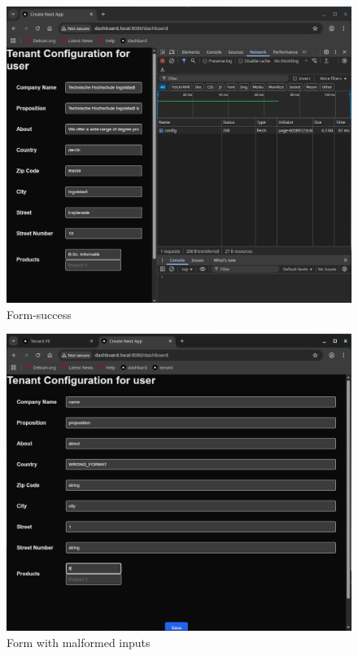 \documentclass[11pt, a4paper, oneside, listof=totoc]{scrartcl}
\begin{document}
                \begin{figure}[h!]
                    \centering
                    \includegraphics[width=\textwidth]{screenshots/eval/dashboardfe/dashboardfe-form-200.png}
                    \caption{Form-success}\label{fig:dashboardfe-form-200}
                \end{figure}

                \begin{figure}[h!]
                    \centering
                    \includegraphics[width=\textwidth]{screenshots/eval/dashboardfe/dashboardfe-form-with-malformed-inputs.png}
                    \caption{Form with malformed inputs}\label{fig:dashboardfe-form-with-malformed-inputs}
                \end{figure}
\end{document}

